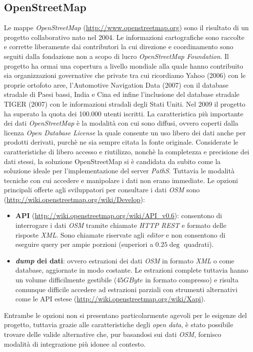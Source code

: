 \subsection{OpenStreetMap}
Le mappe \emph{OpenStreetMap} (\url{http://www.openstreetmap.org}) sono il risultato di un progetto collaborativo nato nel 2004. Le informazioni cartografiche sono raccolte e corrette liberamente dai contributori la cui direzione e coordinamento sono seguiti dalla fondazione non a scopo di lucro \emph{OpenStreetMap Foundation}. Il progetto ha ormai una copertura a livello mondiale alla quale hanno contribuito sia organizzazioni governative che private tra cui ricordiamo Yahoo (2006) con le proprie ortofoto aree, l'Automotive Navigation Data (2007) con il database stradale di Paesi bassi, India e Cina ed infine l'inclusione del database stradale TIGER (2007) con le informazioni stradali degli Stati Uniti. Nel 2009 il progetto ha superato la quota dei 100.000 utenti iscritti. La caratteristica più importante dei dati \emph{OpenStreetMap} è la modalità con cui sono diffusi, ovvero coperti dalla licenza \emph{Open Database License} la quale consente un uso libero dei dati anche per prodotti derivati, purchè ne sia sempre citata la fonte originale.
Considerate le caratteristiche di libero accesso e riutilizzo, nonchè la completezza e precisione dei dati stessi, la soluzione OpenStreetMap si è candidata da subito come la soluzione ideale per l'implementazione del server \emph{PathS}. Tuttavia le modalità tecniche con cui accedere e manipolare i dati non erano immediate. Le opzioni principali offerte agli sviluppatori per consultare i dati \emph{OSM} sono (\url{http://wiki.openstreetmap.org/wiki/Develop}):
\begin{itemize}
  \item \textbf{API} (\url{http://wiki.openstreetmap.org/wiki/API_v0.6}): consentono di interrogare i dati \emph{OSM} tramite chiamate \emph{HTTP REST} e formato delle risposte \emph{XML}. Sono chiamate riservate agli \emph{editor} e non consentono di eseguire query per ampie porzioni (superiori a $0.25\deg$ quadrati).    
  \item \textbf{\emph{dump} dei dati}: ovvero estrazioni dei dati \emph{OSM} in formato \emph{XML} o come database, aggiornate in modo costante. Le estrazioni complete tuttavia hanno un volume difficilmente gestibile ($45GByte$ in formato compresso) e risulta comunque difficile accedere ad estrazioni parziali con strumenti alternativi come le API estese (\url{http://wiki.openstreetmap.org/wiki/Xapi}). 
\end{itemize}
Entrambe le opzioni non si presentano particolarmente agevoli per le esigenze del progetto, tuttavia grazie alle caratteristiche degli \emph{open data}, è stato possibile trovare delle valide alternative che, pur basandosi sui dati \emph{OSM}, fornisco modalità di integrazione più idonee al contesto.

